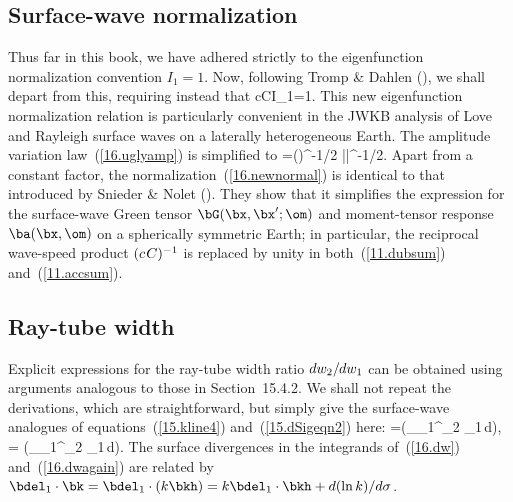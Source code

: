 %
%

\subsection{Surface-wave normalization}
%
%

Thus far in this book, we have adhered strictly to the
eigenfunction normalization convention $I_1=1$.  Now,
following Tromp \& Dahlen (\citeyear{tromp&dahlen92b}),
we shall depart from this, requiring instead that
\eq \label{16.newnormal}
c\hspace{0.2 mm}CI_1=1.
\en
This new eigenfunction normalization relation is
particularly convenient in the JWKB analysis of
Love and Rayleigh surface waves on a laterally
heterogeneous Earth.  The amplitude variation
law~(\ref{16.uglyamp}) is simplified to
\eq \label{16.prettyamp}
=\left(\right)^{-1/2}
\left|\right|^{-1/2}.
\en
Apart from a constant factor, the
normalization~(\ref{16.newnormal}) is identical
to that introduced by Snieder \& Nolet
(\citeyear{snieder&nolet87}).  They show
that it simplifies the expression for the
surface-wave Green tensor $\bG(\bx,\bx';\om)$
and moment-tensor response $\ba(\bx,\om)$
on a spherically symmetric Earth; in particular,
the reciprocal wave-speed product $(c\hspace{0.3 mm}C)^{-1}$
is replaced by unity in both~(\ref{11.dubsum})
and~(\ref{11.accsum}).
%
%

\renewcommand{\thesubsection}{$\!\!\!\raise1.3ex\hbox{$\star$}\!\!$
\arabic{chapter}.\arabic{section}.\arabic{subsection}}
\subsection{Ray-tube width}
%
\renewcommand{\thesubsection}{\arabic{chapter}.\arabic{section}.\arabic{subsection}}

Explicit expressions for the ray-tube width ratio
$dw_2/\hspace{-0.2 mm}dw_1$ can be obtained using
arguments analogous to those in Section~15.4.2.
We shall not repeat the derivations,
which are straightforward, but
simply give the surface-wave analogues
of equations~(\ref{15.kline4})
and~(\ref{15.dSigeqn2}) here:
\eq \label{16.dw}
=\exp\left(\int_{\Delta_1}^{\Delta_2}
\bdel_1\cdot\bkh\,d\Delta\right),
\en
\eq \label{16.dwagain}
=
\exp\left(\int_{\sigma_1}^{\sigma_2}
\bdel_1\cdot\bk\,d\sigma\right).
\en
The surface divergences in the integrands
of~(\ref{16.dw}) and~(\ref{16.dwagain}) are related
by $\bdel_1\cdot\bk=\bdel_1\cdot(k\bkh)
=k\bdel_1\cdot\bkh+d(\ln k)/d\sigma$.
%


